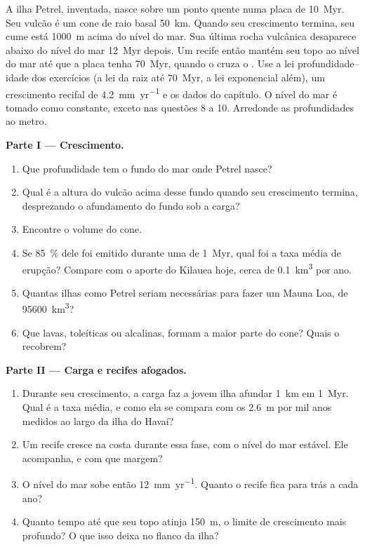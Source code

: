 \begin{problem}\label{pb:b2:oceanic-islands:1}
A ilha Petrel, inventada, nasce sobre um ponto quente numa placa de \qty{10}{Myr}. Seu vulcão é
um cone de raio basal \qty{50}{km}. Quando seu crescimento termina, seu cume está \qty{1000}{m} acima do
nível do mar. Sua última rocha vulcânica desaparece abaixo do nível do mar \qty{12}{Myr} depois. Um recife então
mantém seu topo ao nível do mar até que a placa tenha \qty{70}{Myr}, quando o  cruza o
. Use a lei profundidade--idade dos exercícios (a lei da raiz até \qty{70}{Myr}, a
lei exponencial além), um crescimento recifal de \qty{4.2}{mm.yr^{-1}} e os dados do capítulo.
O nível do mar é tomado como constante, exceto nas questões 8 a 10. Arredonde as profundidades ao metro.

\noindent\textbf{Parte I --- Crescimento.}
\begin{enumerate}
  \item Que profundidade tem o fundo do mar onde Petrel nasce?
  \item Qual é a altura do vulcão acima desse fundo quando seu crescimento termina, desprezando o
        afundamento do fundo sob a carga?
  \item Encontre o volume do cone.
  \item Se \qty{85}{\percent} dele foi emitido durante uma  de \qty{1}{Myr}, qual foi a
        taxa média de erupção? Compare com o aporte do Kilauea hoje, cerca de
        \qty{0.1}{km^3} por ano.
  \item Quantas ilhas como Petrel seriam necessárias para fazer um Mauna Loa, de \qty{95600}{km^3}?
  \item Que lavas, toleíticas ou alcalinas, formam a maior parte do cone? Quais o recobrem?
\end{enumerate}

\noindent\textbf{Parte II --- Carga e recifes afogados.}
\begin{enumerate}[resume]
  \item Durante seu crescimento, a carga faz a jovem ilha afundar \qty{1}{km} em \qty{1}{Myr}. Qual é
        a taxa média, e como ela se compara com os \qty{2.6}{m} por mil anos medidos
        ao largo da ilha do Havaí?
  \item Um recife cresce na costa durante essa fase, com o nível do mar estável. Ele acompanha, e
        com que margem?
  \item O nível do mar sobe então \qty{12}{mm.yr^{-1}}. Quanto o recife fica para trás a cada
        ano?
  \item Quanto tempo até que seu topo atinja \qty{150}{m}, o limite de crescimento mais profundo? O que isso
        deixa no flanco da ilha?
\end{enumerate}


\end{problem}
